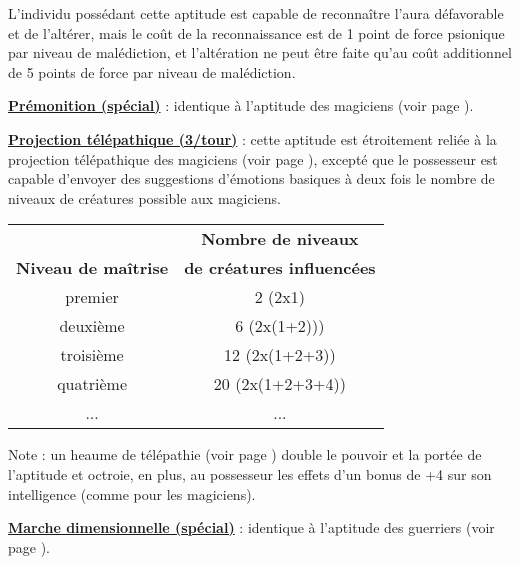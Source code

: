 \bigskip

L'individu possédant cette aptitude est capable de reconnaître l'aura défavorable et de l'altérer, mais le coût de la reconnaissance est de 1 point de force psionique par niveau de malédiction, et l'altération ne peut être faite qu'au coût additionnel de 5 points de force par niveau de malédiction.

\bigskip

\textbf{\uline{Prémonition (spécial)}} : identique à l'aptitude des magiciens (voir page \pageref{magicien-premonition}).

\bigskip

\textbf{\uline{Projection télépathique (3/tour)}} : cette aptitude est étroitement reliée à la projection télépathique des magiciens (voir page \pageref{magicien-projection-telepathique}), excepté que le possesseur est capable d'envoyer des suggestions d'émotions basiques à deux fois le nombre de niveaux de créatures possible aux magiciens.

\bigskip

\begin{tabular}{cc}
                                &\textbf{Nombre de niveaux} \\
\textbf{Niveau de maîtrise}      & \textbf{de créatures influencées}\\
premier     & 2 (2x1)            \\
deuxième    & 6 (2x(1+2)))       \\
troisième   & 12 (2x(1+2+3))     \\
quatrième   & 20 (2x(1+2+3+4))   \\
...         & ...           \\
\end{tabular}

\bigskip

Note : un heaume de télépathie (voir page \pageref{objet-heaume-telepathie}) double le pouvoir et la portée de l'aptitude et octroie, en plus, au possesseur les effets d'un bonus de +4 sur son intelligence (comme pour les magiciens).

\bigskip

\textbf{\uline{Marche dimensionnelle (spécial)}} : identique à l'aptitude des guerriers (voir page \pageref{guerrier-marche-dimensionnelle}).

